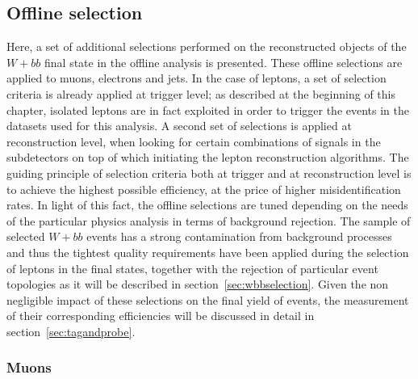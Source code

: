 \subsection{Offline selection}
\label{sec:preselection}

Here, a set of additional selections performed on the 
reconstructed objects of the $W + bb$ final state in the offline analysis 
is presented.
These offline selections are applied to muons, electrons and jets.
In the case of leptons, a set of selection criteria is already applied at 
trigger level; as described at the beginning of this chapter, isolated 
leptons are in fact exploited in order to trigger the events in the 
datasets used for this analysis. A second set of selections is 
applied at reconstruction level, when looking for certain combinations 
of signals in the subdetectors on top of which initiating the lepton 
reconstruction algorithms.
The guiding principle of selection criteria both at trigger and at 
reconstruction level is to achieve the highest possible efficiency, 
at the price of higher misidentification rates.
In light of this fact, the offline selections are tuned 
depending on the needs of the particular physics analysis in terms of 
background rejection.
The sample of selected $W + bb$ events has a strong contamination 
from background processes and thus the tightest quality requirements have been applied 
during the selection of leptons in the final states, together with the rejection of 
particular event topologies as it will be described in section~\ref{sec:wbbselection}.
Given the non negligible impact of these selections on the 
final yield of events, the measurement of their corresponding efficiencies will 
be discussed in detail in section~\ref{sec:tagandprobe}.

\subsubsection{Muons}
\label{sec:muonisooffline}


